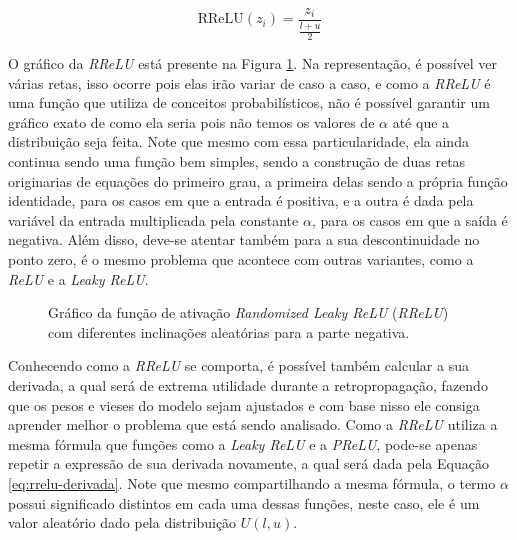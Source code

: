 \begin{equation}
    \text{RReLU}(z_i) = \frac{z_i}{\frac{l + u}{2}}
    \label{eq:equacao-rrelu-teste}
\end{equation}

O gráfico da \textit{RReLU} está presente na Figura \ref{fig:rrelu}. Na representação, é possível ver várias retas, isso ocorre pois elas irão variar de caso a caso, e como a \textit{RReLU} é uma função que utiliza de conceitos probabilísticos, não é possível garantir um gráfico exato de como ela seria pois não temos os valores de $\alpha$ até que a distribuição seja feita. Note que mesmo com essa particularidade, ela ainda continua sendo uma função bem simples, sendo a construção de duas retas originarias de equações do primeiro grau, a primeira delas sendo a própria função identidade, para os casos em que a entrada é positiva, e a outra é dada pela variável da entrada multiplicada pela constante $\alpha$, para os casos em que a saída é negativa. Além disso, deve-se atentar também para a sua descontinuidade no ponto zero, é o mesmo problema que acontece com outras variantes, como a \textit{ReLU} e a \textit{Leaky ReLU}.

\begin{figure}[h!]
    \centering
    \caption{Gráfico da função de ativação \textit{Randomized Leaky ReLU} (\textit{RReLU}) com diferentes inclinações aleatórias para a parte negativa.}
    \label{fig:rrelu}
\end{figure}

Conhecendo como a \textit{RReLU} se comporta, é possível também calcular a sua derivada, a qual será de extrema utilidade durante a retropropagação, fazendo que os pesos e vieses do modelo sejam ajustados e com base nisso ele consiga aprender melhor o problema que está sendo analisado. Como a \textit{RReLU} utiliza a mesma fórmula que funções como a \textit{Leaky ReLU} e a \textit{PReLU}, pode-se apenas repetir a expressão de sua derivada novamente, a qual será dada pela Equação \ref{eq:rrelu-derivada}. Note que mesmo compartilhando a mesma fórmula, o termo $\alpha$ possui significado distintos em cada uma dessas funções, neste caso, ele é um valor aleatório dado pela distribuição $U(l, u)$.

